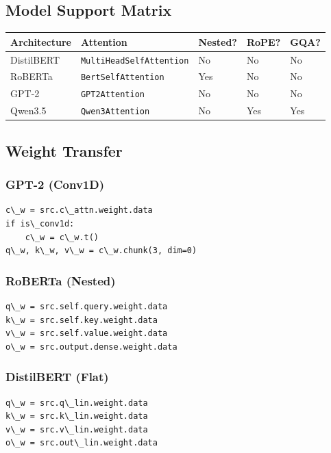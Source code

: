 \subsection{Model Support Matrix}

\begin{table}[H]
\centering
\small
\begin{tabular}{lllll}
\toprule
\textbf{Architecture} & \textbf{Attention} & \textbf{Nested?} & \textbf{RoPE?} & \textbf{GQA?} \\
\midrule
DistilBERT & \texttt{MultiHeadSelfAttention} & No & No & No \\
RoBERTa & \texttt{BertSelfAttention} & Yes & No & No \\
GPT-2 & \texttt{GPT2Attention} & No & No & No \\
Qwen3.5 & \texttt{Qwen3Attention} & No & Yes & Yes \\
\bottomrule
\end{tabular}
\end{table}

\subsection{Weight Transfer}

\subsubsection{GPT-2 (Conv1D)}

\begin{lstlisting}
c\_w = src.c\_attn.weight.data
if is\_conv1d:
    c\_w = c\_w.t()
q\_w, k\_w, v\_w = c\_w.chunk(3, dim=0)
\end{lstlisting}

\subsubsection{RoBERTa (Nested)}

\begin{lstlisting}
q\_w = src.self.query.weight.data
k\_w = src.self.key.weight.data
v\_w = src.self.value.weight.data
o\_w = src.output.dense.weight.data
\end{lstlisting}

\subsubsection{DistilBERT (Flat)}

\begin{lstlisting}
q\_w = src.q\_lin.weight.data
k\_w = src.k\_lin.weight.data
v\_w = src.v\_lin.weight.data
o\_w = src.out\_lin.weight.data
\end{lstlisting}

